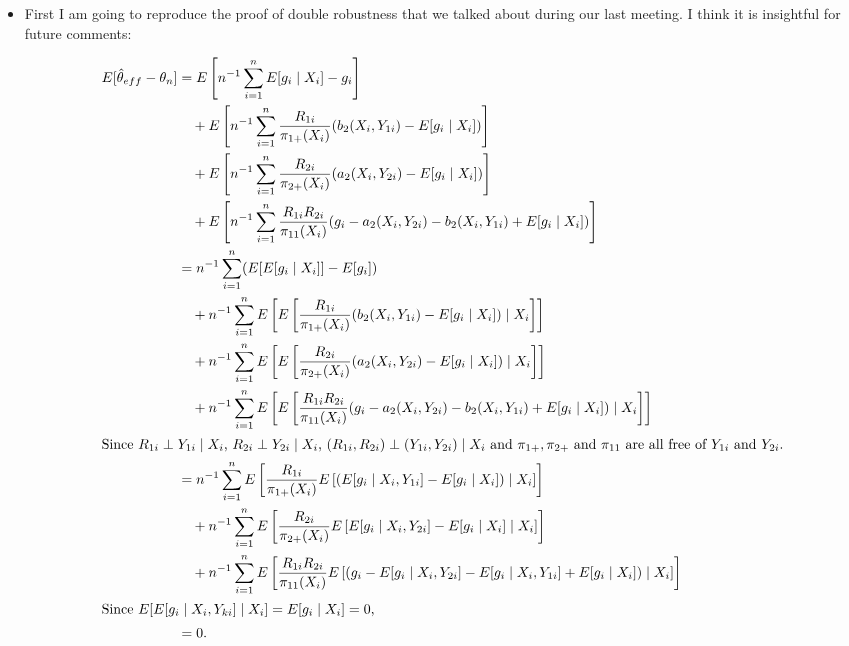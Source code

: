 \documentclass[12pt]{article}
\begin{document}
\begin{itemize}
  \item First I am going to reproduce the proof of double robustness that we
    talked about during our last meeting. I think it is insightful for future
    comments:

    \begin{align*}
      E[\hat \theta_{eff} - \theta_n] 
      &= E\left[n^{-1} \sum_{i = 1}^n E[g_i \mid X_i] - g_i\right]\\
      &\quad+ E\left[n^{-1} \sum_{i = 1}^n \frac{R_{1i}}{\pi_{1+}(X_i)}
      (b_2(X_i, Y_{1i}) - E[g_i \mid X_i])\right]\\
      &\quad+ E\left[n^{-1} \sum_{i = 1}^n \frac{R_{2i}}{\pi_{2+}(X_i)}
      (a_2(X_i, Y_{2i}) - E[g_i \mid X_i])\right]\\
      &\quad+ E\left[n^{-1} \sum_{i = 1}^n \frac{R_{1i} R_{2i}}{\pi_{11}(X_i)} 
      (g_i - a_2(X_i, Y_{2i}) - b_2(X_i, Y_{1i}) + E[g_i \mid X_i])\right]\\
      &= n^{-1} \sum_{i = 1}^n (E[E[g_i \mid X_i]] - E[g_i])\\
      &\quad+ n^{-1} \sum_{i = 1}^n E\left[E\left[\frac{R_{1i}}{\pi_{1+}(X_i)} 
      (b_2(X_i, Y_{1i}) - E[g_i \mid X_i]) \mid X_i\right]\right] \\ 
      &\quad+ n^{-1} \sum_{i = 1}^n E\left[E\left[\frac{R_{2i}}{\pi_{2+}(X_i)} 
      (a_2(X_i, Y_{2i}) - E[g_i \mid X_i]) \mid X_i\right]\right] \\
      &\quad+ n^{-1} \sum_{i = 1}^n E\left[E\left[\frac{R_{1i}
      R_{2i}}{\pi_{11}(X_i)} (g_i - a_2(X_i, Y_{2i}) - b_2(X_i, Y_{1i}) + E[g_i
      \mid X_i]) \mid X_i \right]\right]\\
      \intertext{Since $R_{1i} \perp Y_{1i} \mid X_i$, $R_{2i} \perp Y_{2i} \mid
      X_i$, $(R_{1i}, R_{2i}) \perp (Y_{1i}, Y_{2i}) \mid X_i$ and $\pi_{1+},
      \pi_{2+}$ and $\pi_{11}$ are all free of $Y_{1i}$ and $Y_{2i}$.}
      &= n^{-1} \sum_{i = 1}^n E\left[\frac{R_{1i}}{\pi_{1+}(X_i)} E\left[
        (E[g_i \mid X_i, Y_{1i}] - E[g_i \mid X_i]) \mid X_i\right]\right] \\ 
      &\quad+ n^{-1} \sum_{i = 1}^n E\left[\frac{R_{2i}}{\pi_{2+}(X_i)} 
      E\left[E[g_i \mid X_i, Y_{2i}] - E[g_i \mid X_i] \mid X_i\right]\right] \\
      &\quad+ n^{-1} \sum_{i = 1}^n E\left[\frac{R_{1i}
      R_{2i}}{\pi_{11}(X_i)} E\left[(g_i - E[g_i \mid X_i, Y_{2i}] - 
      E[g_i \mid X_i, Y_{1i}]+ E[g_i \mid X_i]) \mid X_i \right]\right]\\
      \intertext{Since $E[E[g_i \mid X_i, Y_{ki}] \mid X_i] = E[g_i \mid X_i] =
      0$,}
      &= 0.
    \end{align*}


\end{itemize}
\end{document}
